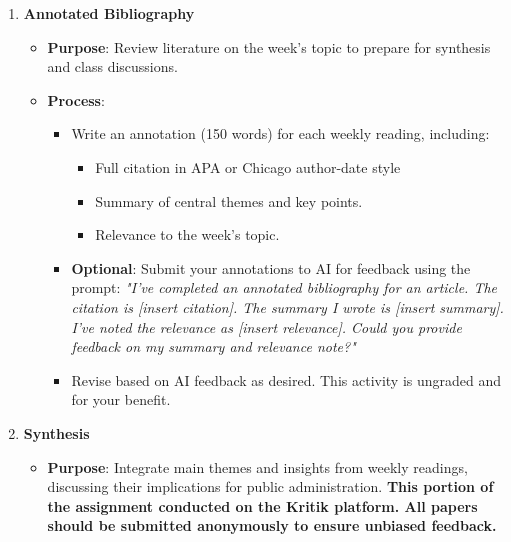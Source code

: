 \documentclass[12pt, letterpaper]{article}
\newenvironment{boldnumlist}
{\begin{enumerate}[label=\textbf{\arabic*.}]}
{\end{enumerate}}
\begin{document}
\begin{boldnumlist}
\item \textbf{Annotated Bibliography}

\begin{itemize}
    \item \textbf{Purpose}: Review literature on the week's topic to prepare for synthesis and class discussions.
    \item \textbf{Process}:
    \begin{itemize}
        \item Write an annotation (150 words) for each weekly reading, including:
        \begin{itemize}
            \item Full citation in APA or Chicago author-date style
            \item Summary of central themes and key points.
            \item Relevance to the week's topic.
        \end{itemize}
        \item \textbf{Optional}: Submit your annotations to AI for feedback using the prompt:
        \textit{"I've completed an annotated bibliography for an article. The citation is [insert citation]. The summary I wrote is [insert summary]. I've noted the relevance as [insert relevance]. Could you provide feedback on my summary and relevance note?"}
        \item Revise based on AI feedback as desired. This activity is ungraded and for your benefit.
    \end{itemize}
\end{itemize}

\item \textbf{Synthesis}

\begin{itemize}
    \item \textbf{Purpose}: Integrate main themes and insights from weekly readings, discussing their implications for public administration. \textbf{This portion of the assignment conducted on the Kritik platform. All papers should be submitted anonymously to ensure unbiased feedback.}
   

\end{itemize}
\end{boldnumlist}
\end{document}
